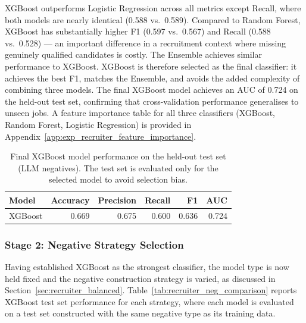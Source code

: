 XGBoost outperforms Logistic Regression
across all metrics except Recall, where both models are nearly identical
(0.588 vs.\ 0.589). Compared to Random Forest, XGBoost has substantially
higher F1 (0.597 vs.\ 0.567) and Recall (0.588 vs.\ 0.528) --- an important difference in a recruitment
context where missing genuinely qualified candidates is costly. The Ensemble
achieves similar performance to XGBoost. XGBoost is therefore selected as the final classifier:
it achieves the best F1, matches the Ensemble, and avoids
the added complexity of combining three models. The final XGBoost model
achieves an AUC of 0.724 on the held-out test set, confirming that
cross-validation performance generalises to unseen jobs. A feature importance table for all three classifiers (XGBoost, Random Forest, Logistic Regression) is provided in Appendix~\ref{app:exp_recruiter_feature_importance}.

\begin{table}[htbp]
    \centering
    \small
    \caption{Final XGBoost model performance on the held-out test set
    (\gls{LLM} negatives). The test set is evaluated only for the selected
    model to avoid selection bias.}
    \label{tab:recruiter_results_test}
    \begin{tabular}{lrrrrr}
        \toprule
        \textbf{Model} & \textbf{Accuracy} & \textbf{Precision}
            & \textbf{Recall} & \textbf{F1} & \textbf{AUC} \\
        \midrule
        XGBoost & 0.669 & 0.675 & 0.600 & 0.636 & 0.724 \\
        \bottomrule
    \end{tabular}
\end{table}



\subsubsection{Stage 2: Negative Strategy Selection}
\label{sec:exp_recruiter_negatives}
 
Having established XGBoost as the strongest classifier, the model type is now held fixed and the negative construction strategy is varied, as discussed in Section~\ref{sec:recruiter_balanced}. Table~\ref{tab:recruiter_neg_comparison} reports XGBoost test set performance for each strategy, where each model is evaluated on a test set constructed with the same negative type as its training data. 
 
